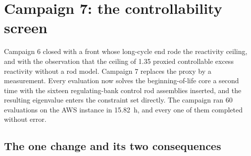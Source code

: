 %
%
%
%

\section{Campaign 7: the controllability screen}
\label{sec:res-c7}

Campaign 6 closed with a front whose long-cycle end rode the
reactivity ceiling, and with the observation that the ceiling of 1.35
proxied controllable excess reactivity without a rod model. Campaign 7
replaces the proxy by a measurement. Every evaluation now solves the
beginning-of-life core a second time with the sixteen regulating-bank
control rod assemblies inserted, and the resulting eigenvalue enters the
constraint set directly. The campaign ran 60 evaluations on the AWS
instance in \SI{15.82}{h}, and every one of them completed without
error.

\subsection{The one change and its two consequences}
\label{sec:res-c7-basis}

